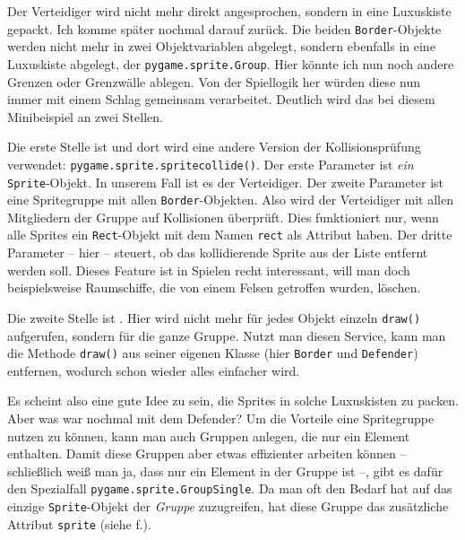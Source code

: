 
Der Verteidiger wird nicht mehr direkt angesprochen, sondern in eine Luxuskiste gepackt. Ich komme später nochmal darauf zurück. Die beiden \texttt{Border}-Objekte werden nicht mehr in zwei Objektvariablen abgelegt, sondern ebenfalls in eine Luxuskiste abgelegt, der \texttt{pygame.sprite.Group}. Hier könnte ich nun noch andere Grenzen oder Grenzwälle ablegen. Von der Spiellogik her würden diese nun immer mit einem Schlag gemeinsam verarbeitet. Deutlich wird das bei diesem Minibeispiel an zwei Stellen.

Die erste Stelle ist  und dort wird eine andere Version der Kollisionsprüfung verwendet: \texttt{pygame.sprite.\-sprite\-collide()}. Der erste Parameter ist \emph{ein} \texttt{Sprite}-Objekt. In unserem Fall ist es der Verteidiger. Der zweite Parameter ist eine Spritegruppe mit allen \texttt{Border}-Objekten. Also wird der Verteidiger mit allen Mitgliedern der Gruppe auf Kollisionen überprüft. Dies funktioniert nur, wenn alle Sprites ein \texttt{Rect}-Objekt mit dem Namen \texttt{rect} als Attribut haben. Der dritte Parameter -- hier \false -- steuert, ob das kollidierende Sprite aus der Liste entfernt werden soll. Dieses Feature ist in Spielen recht interessant, will man doch beispielsweise Raumschiffe, die von einem Felsen getroffen wurden, löschen.

Die zweite Stelle ist . Hier wird nicht mehr für jedes Objekt einzeln \texttt{draw()} aufgerufen, sondern für die ganze Gruppe. Nutzt man diesen Service, kann man die Methode \texttt{draw()} aus seiner eigenen Klasse (hier \texttt{Border} und \texttt{Defender}) entfernen, wodurch schon wieder alles einfacher wird.

Es scheint also eine gute Idee zu sein, die Sprites in solche Luxuskisten zu packen. Aber was war nochmal mit dem Defender? Um die Vorteile eine Spritegruppe nutzen zu können, kann man auch Gruppen anlegen, die nur ein Element enthalten. Damit diese Gruppen aber etwas effizienter arbeiten können -- schließlich weiß man ja, dass nur ein Element in der Gruppe ist --, gibt es dafür den Spezialfall \texttt{pygame.sprite.GroupSingle}. Da man oft den Bedarf hat auf das einzige \texttt{Sprite}-Objekt der \emph{Gruppe} zuzugreifen, hat diese Gruppe das zusätzliche Attribut \texttt{sprite} (siehe f.).


